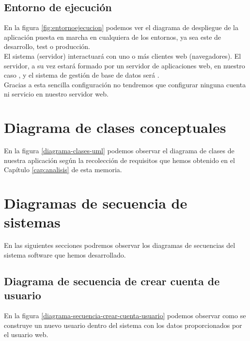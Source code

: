 \subsection{Entorno de ejecución}
En la figura \ref{fig:entornoejecucion} podemos ver el diagrama de despliegue de
la aplicación puesta en marcha en cualquiera de los entornos, ya sea este de
desarrollo, test o
producción.\\

El sistema (servidor) interactuará con uno o más clientes web (navegadores). El
servidor, a su vez estará formado por un servidor de aplicaciones web, en
nuestro caso , y el sistema de gestión de base de datos será
.\\

Gracias a esta sencilla configuración no tendremos que configurar ninguna cuenta
ni servicio en nuestro servidor web.

\clearpage
\section{Diagrama de clases conceptuales}
En la figura \ref{diagrama-clases-uml} podemos observar el diagrama de clases de
nuestra aplicación según la recolección de requisitos que hemos obtenido en el
Capítulo \ref{cap:analisis} de esta memoria.


\clearpage

\section{Diagramas de secuencia de sistemas}

En las siguientes secciones podremos observar los diagramas de secuencias del
sistema software que hemos desarrollado.

\subsection{Diagrama de secuencia de crear cuenta de usuario}

En la figura \ref{diagrama-secuencia-crear-cuenta-usuario} podemos observar como
se construye un nuevo usuario dentro del sistema con los datos proporcionados
por el usuario web.


